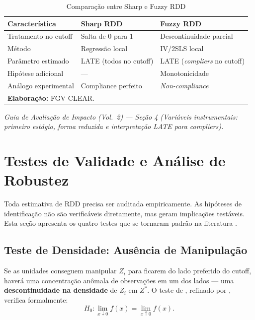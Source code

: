\documentclass[12pt, a4paper, openany]{book}
\begin{document}
\begin{table}[H]
\centering
\caption{Compara\c{c}\~ao entre Sharp e Fuzzy RDD}
\label{tab:sharp_fuzzy}
\small
\begin{tabular}{lll}
\toprule
\textbf{Caracter\'istica} & \textbf{Sharp RDD} & \textbf{Fuzzy RDD} \\
\midrule
Tratamento no cutoff & Salta de 0 para 1 & Descontinuidade parcial \\
M\'etodo & Regress\~ao local & IV/2SLS local \\
Par\^ametro estimado & LATE (todos no cutoff) & LATE (\textit{compliers} no cutoff) \\
Hip\'otese adicional & --- & Monotonicidade \\
An\'alogo experimental & Compliance perfeito & \textit{Non-compliance} \\
\bottomrule
\multicolumn{3}{l}{\footnotesize \textbf{Elabora\c{c}\~ao:} FGV CLEAR.}
\end{tabular}
\end{table}

\begin{conexaobox}
\textit{Guia de Avalia\c{c}\~ao de Impacto (Vol.~2) --- Se\c{c}\~ao 4 (Vari\'aveis instrumentais: primeiro est\'agio, forma reduzida e interpreta\c{c}\~ao LATE para compliers).}
\end{conexaobox}


\chapter{Testes de Validade e An\'alise de Robustez}

Toda estimativa de RDD precisa ser auditada empiricamente. As hip\'oteses de identifica\c{c}\~ao n\~ao s\~ao verific\'aveis diretamente, mas geram implica\c{c}\~oes test\'aveis. Esta se\c{c}\~ao apresenta os quatro testes que se tornaram padr\~ao na literatura \citep{ImbensLemieux2008,LeeLemieux2010}.

\section{Teste de Densidade: Aus\^encia de Manipula\c{c}\~ao}

Se as unidades conseguem manipular $Z_i$ para ficarem do lado preferido do cutoff, haver\'a uma concentra\c{c}\~ao an\^omala de observa\c{c}\~oes em um dos lados --- uma \textbf{descontinuidade na densidade} de $Z_i$ em $Z^*$. O teste de \cite{McCrary2008}, refinado por \cite{CattaneoJanssonMa2020}, verifica formalmente:
\begin{equation}
  H_0: \lim_{x \downarrow 0} f(x) = \lim_{x \uparrow 0} f(x).
\end{equation}
\end{document}
